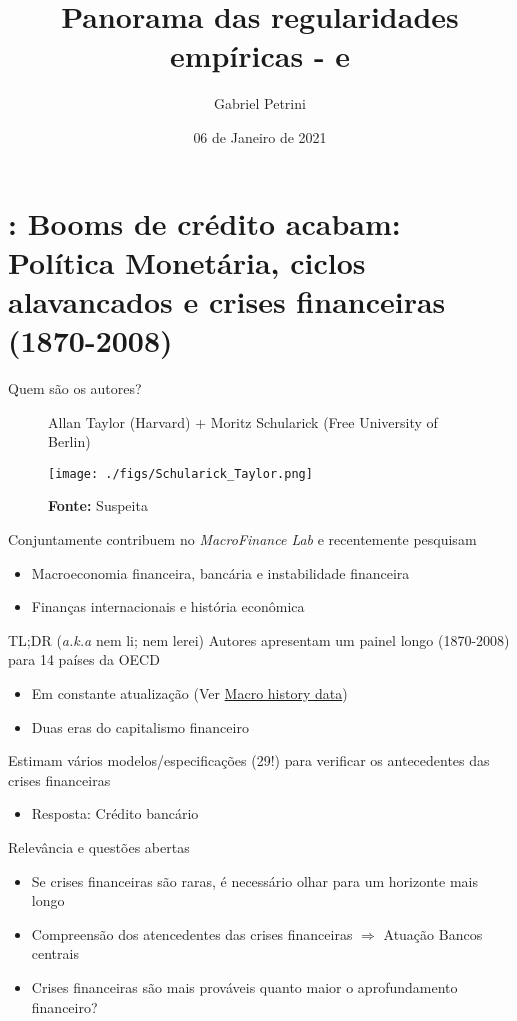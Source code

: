 \documentclass[presentation]{beamer}
\author{Gabriel Petrini}
\date{06 de Janeiro de 2021}
\title{Panorama das regularidades empíricas - \textcite{schularickCreditBoomsGone2012} e  \textcite{sharpe_2020_Why}}
\begin{document}
\maketitle
\section{\textcite{schularickCreditBoomsGone2012}: Booms de crédito acabam: Política Monetária, ciclos alavancados e crises financeiras (1870-2008)}
\label{sec:org4ed0cfe}

\begin{frame}[label={sec:org7e4d491}]{Quem são os autores?}
\begin{figure}[htb]
\centering
\caption{Allan Taylor (Harvard) + Moritz Schularick (Free University of Berlin)}
\texttt{[image: ./figs/Schularick\_Taylor.png]}
\label{fig:autores01}
\caption*{\textbf{Fonte:} Suspeita}
\end{figure}

Conjuntamente contribuem no \emph{MacroFinance Lab} e recentemente pesquisam

\begin{itemize}
\item Macroeconomia financeira, bancária e instabilidade financeira
\item Finanças internacionais e história econômica
\end{itemize}
\end{frame}

\begin{frame}[label={sec:org7f26124}]{TL;DR (\emph{a.k.a} nem li; nem lerei)}
Autores apresentam um painel longo (1870-2008) para 14 países da OECD

\begin{itemize}
\item Em constante atualização (Ver \href{http://www.macrohistory.net/data/}{Macro history data})
\item Duas eras do capitalismo financeiro
\end{itemize}

Estimam vários modelos/especificações (29!) para verificar os antecedentes das crises financeiras
\begin{itemize}
\item \alert{Resposta:} Crédito bancário
\end{itemize}

\begin{block}{Relevância e questões abertas}
\begin{itemize}
\item Se crises financeiras são raras, é necessário olhar para um horizonte mais longo
\item Compreensão dos atencedentes das crises financeiras \(\Rightarrow\) Atuação Bancos centrais
\item Crises financeiras são mais prováveis quanto maior o aprofundamento financeiro?
\end{itemize}
\end{block}
\end{frame}
\end{document}
